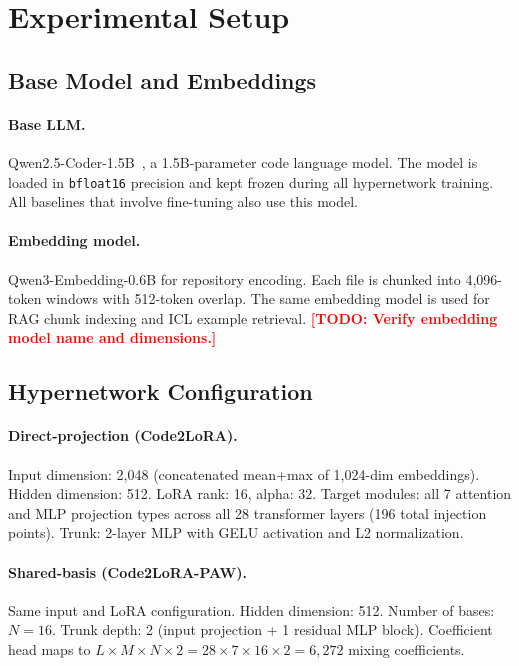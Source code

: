 \documentclass[11pt]{article}
\newcommand{\method}{Code2LoRA}
\newcommand{\todo}[1]{\textcolor{red}{\textbf{[TODO: #1]}}}
\begin{document}
\section{Experimental Setup}
\label{sec:setup}

\subsection{Base Model and Embeddings}

\paragraph{Base LLM.}
Qwen2.5-Coder-1.5B~\cite{hui2024qwen25coder}, a 1.5B-parameter code language model.
The model is loaded in \texttt{bfloat16} precision and kept frozen during all hypernetwork training.
All baselines that involve fine-tuning also use this model.

\paragraph{Embedding model.}
Qwen3-Embedding-0.6B for repository encoding.
Each file is chunked into 4,096-token windows with 512-token overlap.
The same embedding model is used for RAG chunk indexing and ICL example retrieval.
\todo{Verify embedding model name and dimensions.}

\subsection{Hypernetwork Configuration}

\paragraph{Direct-projection (\method{}).}
Input dimension: 2,048 (concatenated mean+max of 1,024-dim embeddings).
Hidden dimension: 512.
LoRA rank: 16, alpha: 32.
Target modules: all 7 attention and MLP projection types across all 28 transformer layers (196 total injection points).
Trunk: 2-layer MLP with GELU activation and L2 normalization.

\paragraph{Shared-basis (\method{}-PAW).}
Same input and LoRA configuration.
Hidden dimension: 512.
Number of bases: $N = 16$.
Trunk depth: 2 (input projection + 1 residual MLP block).
Coefficient head maps to $L \times M \times N \times 2 = 28 \times 7 \times 16 \times 2 = 6{,}272$ mixing coefficients.
\end{document}
